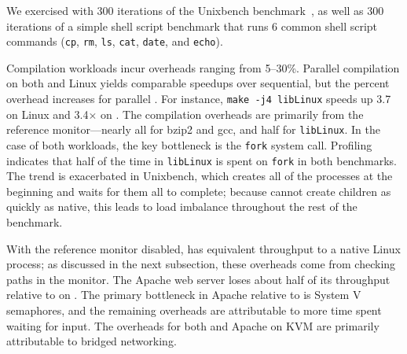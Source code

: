 We exercised \busy{} with 
300 iterations of the Unixbench benchmark~\cite{unixbench}, as well as 
300 iterations of a simple shell script benchmark that runs 6 common shell script commands
({\tt cp}, {\tt rm}, {\tt ls}, {\tt cat}, {\tt date}, and {\tt echo}).

Compilation workloads incur overheads ranging from 5--30\%.
Parallel compilation on both \graphene{} and Linux yields comparable  speedups  over sequential,
but the percent overhead increases for parallel \graphene{}.
For instance, {\tt make -j4 libLinux} speeds up 3.7\x{} on Linux and 3.4$\times$ on \graphene{}.
The compilation overheads are primarily from the reference monitor---nearly all for bzip2 and gcc, and half for {\tt libLinux}.
In the case of both \busy{} workloads, the key bottleneck is the {\tt fork} system call.
Profiling indicates that half of the time in {\tt libLinux} is spent on {\tt fork} in both benchmarks.
The trend is exacerbated in Unixbench, which creates all of the processes at the beginning and
waits for them all to complete; because \graphene{} cannot create children as quickly as native, this leads to 
load imbalance throughout the rest of the benchmark.  

With the reference monitor disabled,  \lighttpd{} has equivalent throughput to a native Linux process;
as discussed in the next subsection, these overheads come from checking paths in the monitor.
The Apache web server loses about half of its throughput relative to \lighttpd{} on \graphene{}.
The primary bottleneck in Apache relative to \lighttpd{} is System V semaphores,
and the remaining overheads are attributable to more time spent waiting for input.
The overheads for both \lighttpd{} and Apache on KVM are primarily attributable
to bridged networking.


